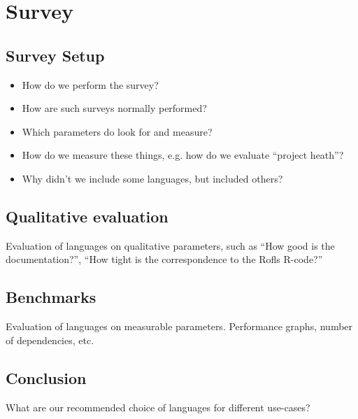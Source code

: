 \part{Survey}
\chapter{Survey Setup}
\begin{itemize}
\item How do we perform the survey?
\item How are such surveys normally performed?
\item Which parameters do look for and measure?
\item How do we measure these things, e.g. how do we evaluate ``project heath''?
\item Why didn't we include some languages, but included others?
\end{itemize}

\chapter{Qualitative evaluation}
Evaluation of languages on qualitative parameters, such as ``How good
is the documentation?'', ``How tight is the correspondence to the
Rofls R-code?''

\chapter{Benchmarks}
Evaluation of languages on measurable parameters. Performance graphs,
number of dependencies, etc.

\chapter{Conclusion}
What are our recommended choice of languages for different use-cases? 

